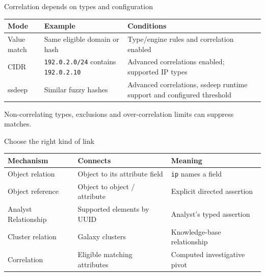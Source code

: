 \begin{frame}{Correlation depends on types and configuration}
  \begin{tabular}{@{}L{.17\textwidth}L{.38\textwidth}L{.38\textwidth}@{}}
    \toprule
    Mode & Example & Conditions \\
    \midrule
    Value match & Same eligible domain or hash & Type/engine rules and correlation enabled \\
    CIDR & \texttt{192.0.2.0/24} contains \texttt{192.0.2.10} & Advanced correlations enabled; supported IP types \\
    ssdeep & Similar fuzzy hashes & Advanced correlations, ssdeep runtime support and configured threshold \\
    \bottomrule
  \end{tabular}
  \medskip
  Non-correlating types, exclusions and over-correlation limits can suppress matches.
\end{frame}

\begin{frame}{Choose the right kind of link}
  \begin{tabular}{@{}L{.24\textwidth}L{.34\textwidth}L{.35\textwidth}@{}}
    \toprule
    Mechanism & Connects & Meaning \\
    \midrule
    Object relation & Object to its attribute field & \texttt{ip} names a field \\
    Object reference & Object to object / attribute & Explicit directed assertion \\
    Analyst Relationship & Supported elements by UUID & Analyst's typed assertion \\
    Cluster relation & Galaxy clusters & Knowledge-base relationship \\
    Correlation & Eligible matching attributes & Computed investigative pivot \\
    \bottomrule
  \end{tabular}
\end{frame}

